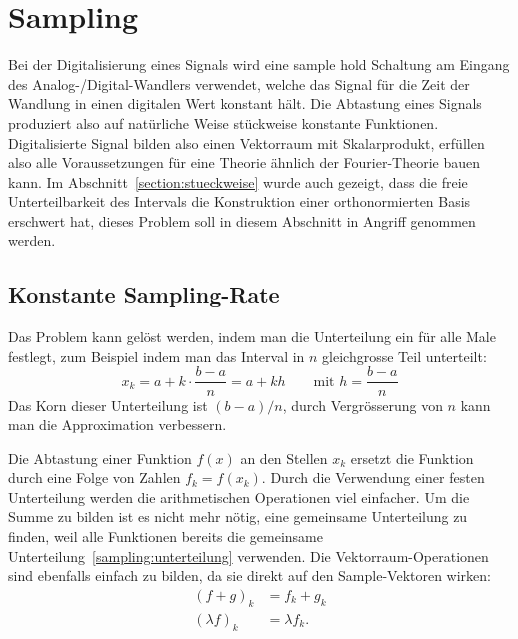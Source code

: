 %
%
%
\section{Sampling%
\label{section:sampling}}
Bei der Digitalisierung eines Signals wird eine sample hold Schaltung am
Eingang des Analog-/Digital-Wandlers verwendet, welche das Signal für die
Zeit der Wandlung in einen digitalen Wert konstant hält.
Die Abtastung eines Signals produziert also auf natürliche Weise
stückweise konstante Funktionen.
Digitalisierte Signal bilden also einen Vektorraum mit Skalarprodukt,
erfüllen also alle Voraussetzungen für eine Theorie ähnlich der Fourier-Theorie
bauen kann.
Im Abschnitt~\ref{section:stueckweise} wurde auch gezeigt, dass die freie
Unterteilbarkeit des Intervals die Konstruktion einer orthonormierten Basis
erschwert hat, dieses Problem soll in diesem Abschnitt in Angriff genommen
werden.

\subsection{Konstante Sampling-Rate}
Das Problem kann gelöst werden, indem man die Unterteilung ein für alle
Male festlegt, zum Beispiel indem man das Interval in $n$ gleichgrosse
Teil unterteilt:
\begin{equation}
x_k = a + k\cdot\frac{b-a}{n} = a + kh
\qquad
\text{mit $\displaystyle h=\frac{b-a}n$}
\label{sampling:unterteilung}
\end{equation}
Das Korn dieser Unterteilung ist $(b-a)/n$, durch Vergrösserung von $n$
kann man die Approximation verbessern.

Die Abtastung einer Funktion $f(x)$ an den Stellen $x_k$ ersetzt
die Funktion durch eine Folge von Zahlen $f_k = f(x_k)$.
Durch die Verwendung einer festen Unterteilung werden die arithmetischen
Operationen viel einfacher.
Um die Summe zu bilden ist es nicht mehr nötig, eine gemeinsame
Unterteilung zu finden, weil alle Funktionen bereits die gemeinsame
Unterteilung~\eqref{sampling:unterteilung} verwenden.
Die Vektorraum-Operationen sind ebenfalls einfach zu bilden,
da sie direkt auf den Sample-Vektoren wirken:
\begin{align*}
(f+g)_k &= f_k + g_k \\
(\lambda f)_k &= \lambda f_k.
\end{align*}

